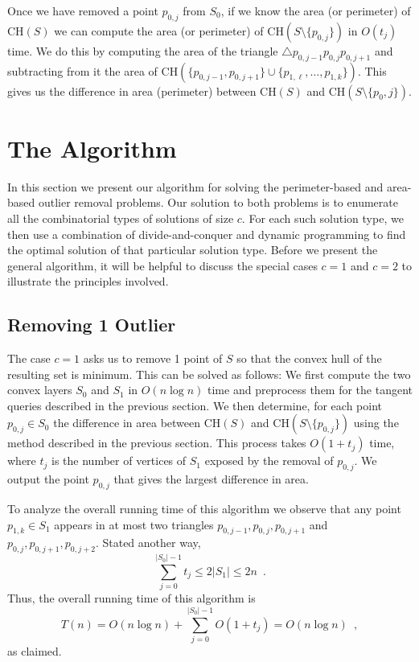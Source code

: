 \documentclass[lotsofwhite]{patmorin}
\newcommand{\ch}{\mathrm{CH}}
\begin{document}
Once we have removed a point $p_{0,j}$ from $S_0$, if we know the area
(or perimeter) of $\ch(S)$ we can compute the area (or perimeter) of
$\ch(S\setminus\{p_{0,j}\})$ in $O(t_j)$ time.  We do this by
computing the area of the triangle $\triangle
p_{0,j-1}p_{0,j}p_{0,j+1}$ and subtracting from it the area of
$\ch(\{p_{0,j-1},p_{0,j+1}\}\cup\{p_{1,\ell},\ldots,p_{1,k}\})$.  This
gives us the difference in area (perimeter) between $\ch(S)$ and
$\ch(S\setminus\{p_0,j\})$.


\section{The Algorithm}

In this section we present our algorithm for solving the
perimeter-based and area-based outlier removal problems. Our solution
to both problems is to enumerate all the combinatorial types of
solutions of size $c$.  For each such solution type, we then use a
combination of divide-and-conquer and dynamic programming to find the
optimal solution of that particular solution type.  Before we present
the general algorithm, it will be helpful to discuss the special cases
$c=1$ and $c=2$ to illustrate the principles involved.

\subsection{Removing 1 Outlier}

The case $c=1$ asks us to remove 1 point of $S$ so that the convex
hull of the resulting set is minimum.  This can be solved as follows:
We first compute the two convex layers $S_0$ and $S_1$ in $O(n\log n)$
time and preprocess them for the tangent queries described in the
previous section.  We then determine, for each point $p_{0,j}\in S_0$
the difference in area between $\ch(S)$ and
$\ch(S\setminus\{p_{0,j}\})$ using the method described in the
previous section.  This process takes $O(1+t_j)$ time, where $t_j$ is
the number of vertices of $S_1$ exposed by the removal of $p_{0,j}$.
We output the point $p_{0,j}$ that gives the largest difference in
area.

To analyze the overall running time of this algorithm we observe that
any point $p_{1,k}\in S_1$ appears in at most two triangles
$p_{0,j-1},p_{0,j},p_{0,j+1}$ and
$p_{0,j},p_{0,j+1},p_{0,j+2}$.  Stated another way,
\[
     \sum_{j=0}^{|S_0|-1} t_j \le 2|S_1|\le 2n \enspace .
\]
Thus, the overall running time of this algorithm is
\[
     T(n) = O(n\log n)+\sum_{j=0}^{|S_0|-1} O(1+t_j) = O(n\log n) \enspace ,
\]
as claimed.
\end{document}
